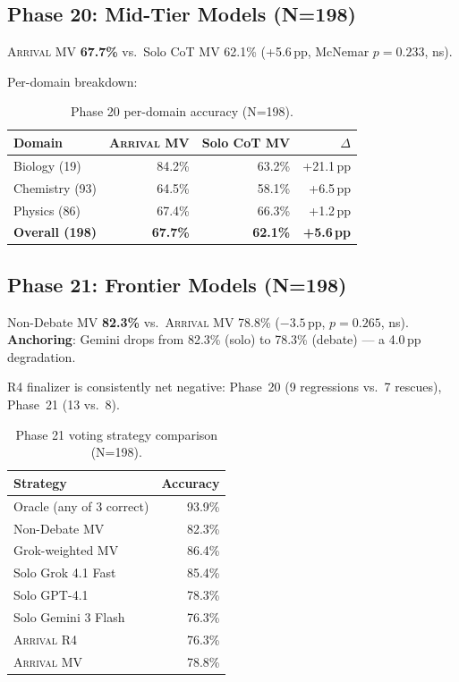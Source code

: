 \documentclass[11pt,a4paper]{article}
\newcommand{\arrival}{\textsc{Arrival}\xspace}
\newcommand{\pp}{\,pp\xspace}
\begin{document}
\subsection{Phase 20: Mid-Tier Models (N=198)}

\begin{resultbox}
\arrival MV \textbf{67.7\%} vs.\ Solo CoT MV 62.1\%
(+5.6\pp, McNemar $p=0.233$, ns).
\end{resultbox}

Per-domain breakdown:

\begin{table}[H]
\centering\small
\caption{Phase 20 per-domain accuracy (N=198).}\label{tab:phase20domain}
\begin{tabular}{@{}lrrr@{}}
\toprule
\textbf{Domain} & \textbf{\arrival MV} & \textbf{Solo CoT MV} & \textbf{$\Delta$} \\
\midrule
Biology (19)   & 84.2\% & 63.2\% & +21.1\pp \\
Chemistry (93) & 64.5\% & 58.1\% & +6.5\pp \\
Physics (86)   & 67.4\% & 66.3\% & +1.2\pp \\
\midrule
\textbf{Overall (198)} & \textbf{67.7\%} & \textbf{62.1\%} & \textbf{+5.6\pp} \\
\bottomrule
\end{tabular}
\end{table}

\subsection{Phase 21: Frontier Models (N=198)}

\begin{resultbox}
Non-Debate MV \textbf{82.3\%} vs.\ \arrival MV 78.8\%
($-3.5$\pp, $p=0.265$, ns).\\
\textbf{Anchoring}: Gemini drops from 82.3\% (solo) to 78.3\% (debate)
--- a 4.0\pp degradation.
\end{resultbox}

R4 finalizer is consistently net negative: Phase~20 (9 regressions vs.\
7 rescues), Phase~21 (13 vs.\ 8).

\begin{table}[H]
\centering\small
\caption{Phase 21 voting strategy comparison (N=198).}\label{tab:phase21voting}
\begin{tabular}{@{}lr@{}}
\toprule
\textbf{Strategy} & \textbf{Accuracy} \\
\midrule
Oracle (any of 3 correct) & 93.9\% \\
Non-Debate MV             & 82.3\% \\
Grok-weighted MV          & 86.4\% \\
Solo Grok 4.1 Fast        & 85.4\% \\
Solo GPT-4.1              & 78.3\% \\
Solo Gemini 3 Flash       & 76.3\% \\
\arrival R4               & 76.3\% \\
\arrival MV               & 78.8\% \\
\bottomrule
\end{tabular}
\end{table}
\end{document}

